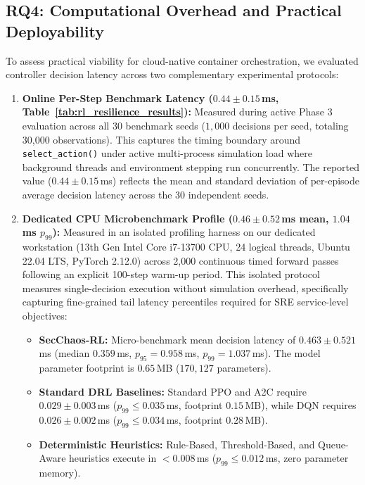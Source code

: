\documentclass[ASNA,twocolumn]{USG}
\begin{document}
\subsection{RQ4: Computational Overhead and Practical Deployability}
To assess practical viability for cloud-native container orchestration, we evaluated controller decision latency across two complementary experimental protocols:
\begin{enumerate}
    \item \textbf{Online Per-Step Benchmark Latency ($0.44 \pm 0.15$\,ms, Table~\ref{tab:rl_resilience_results}):} Measured during active Phase 3 evaluation across all 30 benchmark seeds ($1,000$ decisions per seed, totaling 30,000 observations). This captures the timing boundary around \texttt{select\_action()} under active multi-process simulation load where background threads and environment stepping run concurrently. The reported value ($0.44 \pm 0.15$\,ms) reflects the mean and standard deviation of per-episode average decision latency across the 30 independent seeds.
    \item \textbf{Dedicated CPU Microbenchmark Profile ($0.46 \pm 0.52$\,ms mean, $1.04$\,ms $p_{99}$):} Measured in an isolated profiling harness on our dedicated workstation (13th Gen Intel Core i7-13700 CPU, 24 logical threads, Ubuntu 22.04 LTS, PyTorch 2.12.0) across 2,000 continuous timed forward passes following an explicit 100-step warm-up period. This isolated protocol measures single-decision execution without simulation overhead, specifically capturing fine-grained tail latency percentiles required for SRE service-level objectives:
    \begin{itemize}
        \item \textbf{SecChaos-RL:} Micro-benchmark mean decision latency of $\mathbf{0.463 \pm 0.521}$\,ms (median $0.359$\,ms, $p_{95} = 0.958$\,ms, $p_{99} = 1.037$\,ms). The model parameter footprint is $0.65$\,MB ($170,127$ parameters).
        \item \textbf{Standard DRL Baselines:} Standard PPO and A2C require $0.029 \pm 0.003$\,ms ($p_{99} \le 0.035$\,ms, footprint $0.15$\,MB), while DQN requires $0.026 \pm 0.002$\,ms ($p_{99} \le 0.034$\,ms, footprint $0.28$\,MB).
        \item \textbf{Deterministic Heuristics:} Rule-Based, Threshold-Based, and Queue-Aware heuristics execute in $< 0.008$\,ms ($p_{99} \le 0.012$\,ms, zero parameter memory).
    \end{itemize}
\end{enumerate}
\end{document}
